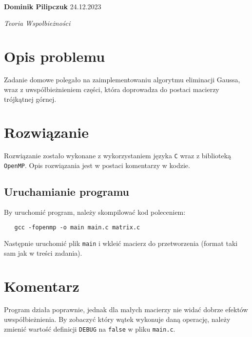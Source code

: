 \documentclass[11pt]{article}
\begin{document}
\textbf{Dominik Pilipczuk} \hfill 24.12.2023

\textit{Teoria Wspołbieżności}
\section{Opis problemu}
Zadanie domowe polegało na zaimplementowaniu algorytmu eliminacji Gaussa,
wraz z uwspółbieżnieniem części, która doprowadza do postaci macierzy trójkątnej
górnej.
\section{Rozwiązanie}
Rozwiązanie zostało wykonane z wykorzystaniem języka \texttt{C}
wraz z biblioteką \texttt{OpenMP}. Opis rozwiązania jest w postaci komentarzy
w kodzie.
\subsection{Uruchamianie programu}
By uruchomić program, należy skompilować kod poleceniem:
\begin{verbatim}
   gcc -fopenmp -o main main.c matrix.c 
\end{verbatim}
Następnie uruchomić plik \texttt{main} i wkleić macierz do przetworzenia
(format taki sam jak w treści zadania).
\section{Komentarz}
Program działa poprawnie, jednak dla małych macierzy nie widać dobrze efektów
uwspółbieżnienia. By zobaczyć który wątek wykonuje daną operację, należy zmienić
wartość definicji \texttt{DEBUG} na \texttt{false} w pliku \texttt{main.c}.
\end{document}
